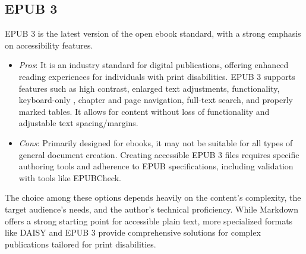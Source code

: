 \subsection{EPUB 3}
EPUB 3 is the latest version of the open ebook standard, with a strong emphasis on accessibility features. \supercite{ElsevierEPUB3, CNIBEPUB}
\begin{itemize}
	\item \emph{Pros}: It is an industry standard for digital publications, offering enhanced reading experiences for individuals with print disabilities. \supercite{ElsevierEPUB3} EPUB 3 supports features such as high contrast, enlarged text adjustments,  functionality, keyboard-only , chapter and page navigation, full-text search, and properly marked tables. \supercite{ElsevierEPUB3} It allows for content  without loss of functionality and adjustable text spacing/margins. \supercite{ElsevierEPUB3}
	\item \emph{Cons}: Primarily designed for ebooks, it may not be suitable for all types of general document creation. Creating accessible EPUB 3 files requires specific authoring tools and adherence to EPUB specifications, including validation with tools like EPUBCheck. \supercite{CNIBEPUB}
\end{itemize}
The choice among these options depends heavily on the content's complexity, the target audience's needs, and the author's technical proficiency. While Markdown offers a strong starting point for accessible plain text, more specialized formats like DAISY and EPUB 3 provide comprehensive solutions for complex publications tailored for print disabilities.

